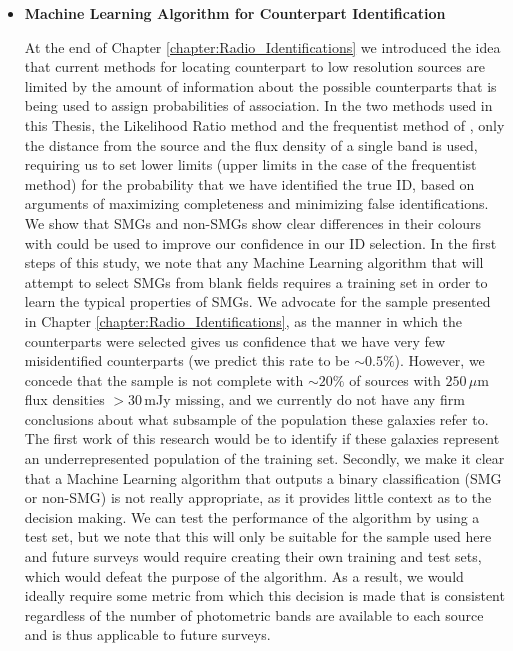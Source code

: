 \begin{itemize}
\item \textbf{Machine Learning Algorithm for Counterpart Identification}

At the end of Chapter \ref{chapter:Radio_Identifications} we introduced the idea that current methods for locating counterpart to low resolution sources are limited by the amount of information about the possible counterparts that is being used to assign probabilities of association. In the two methods used in this Thesis, the Likelihood Ratio method and the frequentist method of \citealt{Lilly_1999}, only the distance from the source and the flux density of a single band is used, requiring us to set lower limits (upper limits in the case of the frequentist method) for the probability that we have identified the true ID, based on arguments of maximizing completeness and minimizing false identifications. We show that SMGs and non-SMGs show clear differences in their colours with could be used to improve our confidence in our ID selection. In the first steps of this study, we note that any Machine Learning algorithm that will attempt to select SMGs from blank fields requires a training set in order to learn the typical properties of SMGs. We advocate for the sample presented in Chapter \ref{chapter:Radio_Identifications}, as the manner in which the counterparts were selected gives us confidence that we have very few misidentified counterparts (we predict this rate to be $\sim0.5\%$). However, we concede that the sample is not complete with $\sim20\%$ of sources with $250\,\mu$m flux densities $>30\,$mJy missing, and we currently do not have any firm conclusions about what subsample of the population these galaxies refer to. The first work of this research would be to identify if these galaxies represent an underrepresented population of the training set. Secondly, we make it clear that a Machine Learning algorithm that outputs a binary classification (SMG or non-SMG) is not really appropriate, as it provides little context as to the decision making. We can test the performance of the algorithm by using a test set, but we note that this will only be suitable for the sample used here and future surveys would require creating their own training and test sets, which would defeat the purpose of the algorithm. As a result, we would ideally require some metric from which this decision is made that is consistent regardless of the number of photometric bands are available to each source and is thus applicable to future surveys.

\end{itemize}

